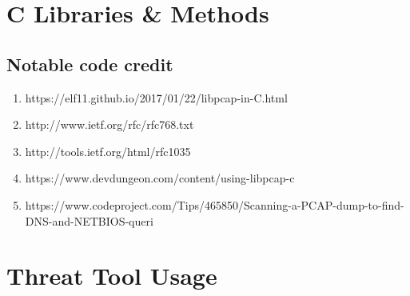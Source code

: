 \section{C Libraries \& Methods}
\subsection{Notable code credit}
\begin{enumerate}
    \item https://elf11.github.io/2017/01/22/libpcap-in-C.html
    \item http://www.ietf.org/rfc/rfc768.txt
    \item http://tools.ietf.org/html/rfc1035
    \item https://www.devdungeon.com/content/using-libpcap-c
    \item https://www.codeproject.com/Tips/465850/Scanning-a-PCAP-dump-to-find-DNS-and-NETBIOS-queri
\end{enumerate}


\section{Threat Tool Usage}

